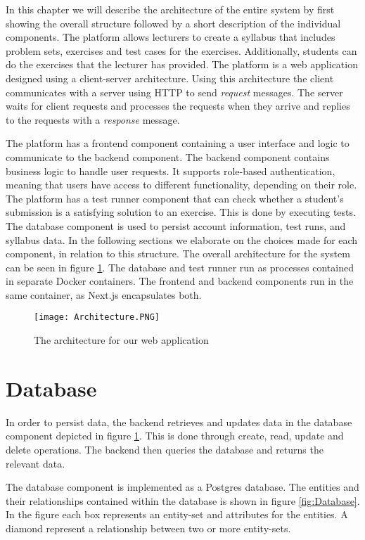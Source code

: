 In this chapter we will describe the architecture of the entire system by first showing the overall structure followed by a short description of the individual components.
The platform allows lecturers to create a syllabus that includes problem sets, exercises and test cases for the exercises. Additionally, students can do the exercises that the lecturer has provided.
The platform is a web application designed using a client-server architecture. Using this architecture the client communicates with a server using HTTP to send \textit{request} messages. The server waits for client requests and processes the requests when they arrive and replies to the requests with a \textit{response} message.

The platform has a frontend component containing a user interface and logic to communicate to the backend component. 
The backend component contains business logic to handle user requests. 
It supports role-based authentication, meaning that users have access to different functionality, depending on their role. 
The platform has a test runner component that can check whether a student's submission is a satisfying solution to an exercise. 
This is done by executing tests. The database component is used to persist account information, test runs, and syllabus data.
In the following sections we elaborate on the choices made for each component, in relation to this structure.
The overall architecture for the system can be seen in figure \ref{fig:Architecture}.
The database and test runner run as processes contained in separate Docker containers. The frontend and backend components run in the same container, as Next.js encapsulates both.

\begin{figure}[H]
	\texttt{[image: Architecture.PNG]}
	\centering
	\caption{The architecture for our web application}
	\label{fig:Architecture}
\end{figure}


\section{Database}
In order to persist data, the backend retrieves and updates data in the database component depicted in figure \ref{fig:Architecture}. This is done through create, read, update and delete operations.
The backend then queries the database and returns the relevant data.

The database component is implemented as a Postgres database. The entities and their relationships contained within the database is shown in figure \ref{fig:Database}. In the figure each box represents an entity-set and attributes for the entities. A diamond represent a relationship between two or more entity-sets.

